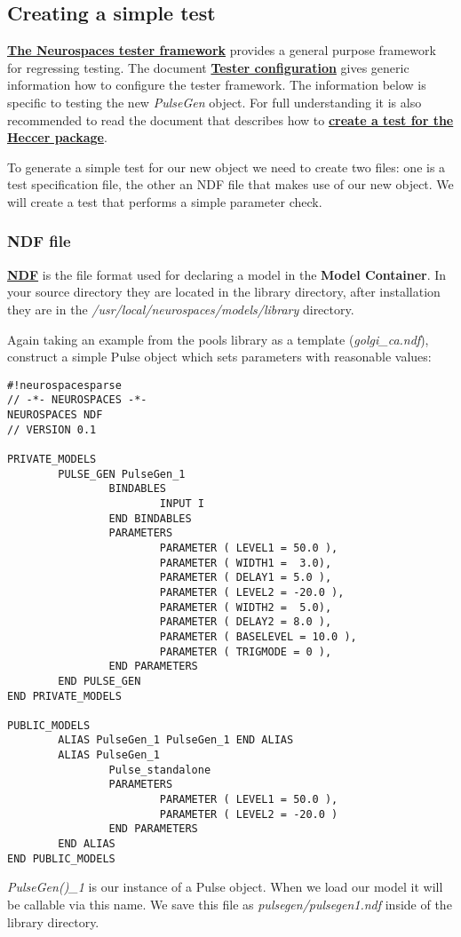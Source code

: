 \documentclass[12pt]{article}
\begin{document}
\subsection*{Creating a simple test}

\href{../neurospaces-tester/neurospaces-tester.tex}{\bf The Neurospaces
  tester framework} provides a general purpose framework for
regressing testing.  The document
\href{../tester-configuration/tester-configuration.tex}{\bf Tester configuration} gives generic
information how to configure the tester framework.  The information
below is specific to testing the new {\it PulseGen} object.  For full
understanding it is also recommended to read the document that
describes how to
\href{../genesis-create-test-heccer/genesis-create-test-heccer.tex}{\bf create a test for the Heccer package}.

To generate a simple test for our new object we need to create two
files: one is a test specification file, the other an NDF file that
makes use of our new object. We will create a test that performs a
simple parameter check.

\subsubsection*{NDF file}

\href{../ndf-file-format/ndf-file-format.tex}{\bf NDF} is the file format used for declaring a model in the {\bf Model Container}. In your source directory they are located in the library directory, after installation they are in the {\it /usr/local/neurospaces/models/library} directory.

Again taking an example from the pools library as a template ({\it golgi\_ca.ndf}), construct a simple Pulse object which sets parameters with reasonable values:
\begin{verbatim}
#!neurospacesparse
// -*- NEUROSPACES -*-
NEUROSPACES NDF
// VERSION 0.1

PRIVATE_MODELS
        PULSE_GEN PulseGen_1
                BINDABLES
                        INPUT I
                END BINDABLES
                PARAMETERS
                        PARAMETER ( LEVEL1 = 50.0 ),
                        PARAMETER ( WIDTH1 =  3.0),
                        PARAMETER ( DELAY1 = 5.0 ),
                        PARAMETER ( LEVEL2 = -20.0 ),
                        PARAMETER ( WIDTH2 =  5.0),
                        PARAMETER ( DELAY2 = 8.0 ),
                        PARAMETER ( BASELEVEL = 10.0 ),
                        PARAMETER ( TRIGMODE = 0 ),
                END PARAMETERS
        END PULSE_GEN
END PRIVATE_MODELS

PUBLIC_MODELS
        ALIAS PulseGen_1 PulseGen_1 END ALIAS
        ALIAS PulseGen_1 
                Pulse_standalone
                PARAMETERS
                        PARAMETER ( LEVEL1 = 50.0 ),
                        PARAMETER ( LEVEL2 = -20.0 )
                END PARAMETERS
        END ALIAS
END PUBLIC_MODELS
\end{verbatim}
{\it PulseGen()\_1} is our instance of a Pulse object. When we load our model it will be callable via this name. We save this file as {\it pulsegen/pulsegen1.ndf} inside of the library directory.
\end{document}
